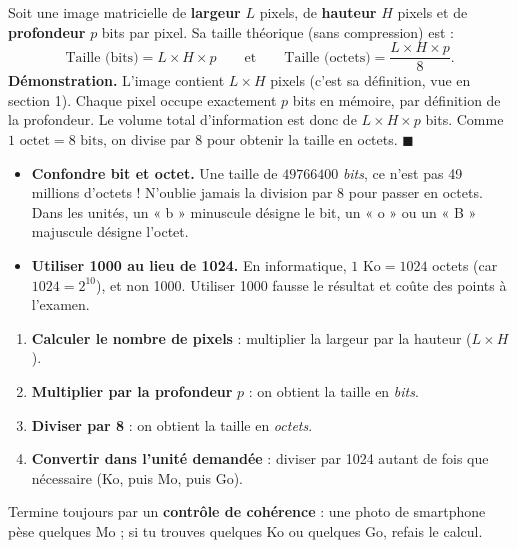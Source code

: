 \documentclass[11pt]{article}
\newcounter{popsec}
\newcounter{popsub}
\newcommand{\courssub}[1]{%
  \stepcounter{popsub}%
  \par\vspace{9pt}\noindent{\popxbold\fontsize{11.5}{13}\selectfont\color{popink}{\color{poporange}\thepopsec.\thepopsub}\hspace{6pt}#1}\par\nopagebreak\vspace{4pt}
}
\begin{document}
\courssub{La formule fondamentale}

\begin{propriete}
Soit une image matricielle de \textbf{largeur} $L$ pixels, de \textbf{hauteur} $H$ pixels et de \textbf{profondeur} $p$ bits par pixel. Sa taille théorique (sans compression) est :
\[ \text{Taille (bits)} = L \times H \times p \qquad\text{et}\qquad \text{Taille (octets)} = \frac{L \times H \times p}{8}. \]
\textbf{Démonstration.} L'image contient $L \times H$ pixels (c'est sa définition, vue en section 1). Chaque pixel occupe exactement $p$ bits en mémoire, par définition de la profondeur. Le volume total d'information est donc de $L \times H \times p$ bits. Comme $1 \text{ octet} = 8 \text{ bits}$, on divise par 8 pour obtenir la taille en octets. $\blacksquare$
\end{propriete}

\begin{attention}
\begin{itemize}
\item \textbf{Confondre bit et octet.} Une taille de $\num{49766400}$ \emph{bits}, ce n'est pas 49 millions d'octets ! N'oublie jamais la division par 8 pour passer en octets. Dans les unités, un « b » minuscule désigne le bit, un « o » ou un « B » majuscule désigne l'octet.
\item \textbf{Utiliser 1000 au lieu de 1024.} En informatique, $1 \text{ Ko} = 1024$ octets (car $1024 = 2^{10}$), et non 1000. Utiliser 1000 fausse le résultat et coûte des points à l'examen.
\end{itemize}
\end{attention}

\begin{methode}
\begin{enumerate}
\item \textbf{Calculer le nombre de pixels} : multiplier la largeur par la hauteur ($L \times H$).
\item \textbf{Multiplier par la profondeur} $p$ : on obtient la taille en \emph{bits}.
\item \textbf{Diviser par 8} : on obtient la taille en \emph{octets}.
\item \textbf{Convertir dans l'unité demandée} : diviser par 1024 autant de fois que nécessaire (Ko, puis Mo, puis Go).
\end{enumerate}
Termine toujours par un \textbf{contrôle de cohérence} : une photo de smartphone pèse quelques Mo ; si tu trouves quelques Ko ou quelques Go, refais le calcul.
\end{methode}
\end{document}
